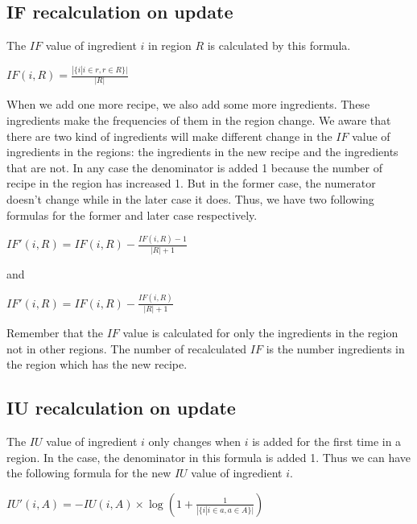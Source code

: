 \subsection{IF recalculation on update}

The $IF$ value of ingredient $i$ in region $R$ is calculated by this formula.
\begin{center}
\smallskip
$ IF(i,R)= \frac{\displaystyle | \{i | i \in r, r \in R \} | }{\displaystyle | R | }$
\smallskip
\label{eq:Ori}
\end{center}

When we add one more recipe, we also add some more ingredients. These ingredients make the frequencies of them in the region change. We aware that there are two kind of ingredients will make different change in the $IF$ value of ingredients in the regions: the ingredients in the new recipe and the ingredients that are not. In any case the denominator is added 1 because the number of recipe in the region has increased 1. But in the former case, the numerator doesn't change while in the later case it does. Thus, we have two following formulas for the former and later case respectively. 

\begin{center}
\smallskip
$ IF'(i,R)=  IF(i,R) - \frac{\displaystyle  IF(i,R)-1 }{\displaystyle | R | +1}$
\smallskip
\end{center}

and 

\begin{center}
\smallskip
$ IF'(i,R)=  IF(i,R) - \frac{\displaystyle  IF(i,R)}{\displaystyle | R | +1}$
\smallskip
\end{center}

Remember that the $IF$ value is calculated for only the ingredients in the region not in other regions. The number of recalculated $IF$ is the number ingredients in the region which has the new recipe.
 
\subsection{IU recalculation on update}

The $IU$ value of ingredient $i$ only changes when $i$ is added for the first time in a region. In the case, the denominator in this formula is added 1. Thus we can have the following formula for the new $IU$ value of ingredient $i$.

\begin{center}
\smallskip
$IU'(i,A)= -IU(i,A)\times\log{(\displaystyle 1+  \frac{1}{\displaystyle |\{i|i \in a, a \in A \}|})}$
\smallskip
\end{center}

